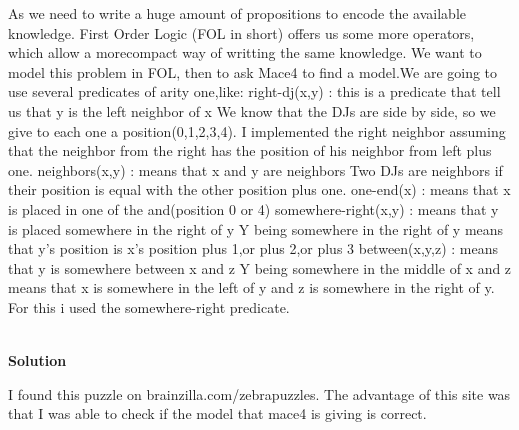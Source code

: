 ﻿\documentclass[a4paper,12pt]{report}
\begin{document}
As we need to write a huge amount of propositions to encode the available knowledge.\newline
First Order Logic (FOL in short) offers us some more operators, which allow a more\newline compact way of writting the same knowledge.\newline
We want to model this problem in FOL, then to ask Mace4 to find a model.We are going to \newline use several predicates of arity one,like:\newline \newline
right-dj(x,y) : this is a predicate that tell us that y is the left neighbor of x\newline
We know that the DJs are side by side, so we give to each one a position(0,1,2,3,4). I implemented the right neighbor assuming that the neighbor from the right has the \newline position of his neighbor from left plus one. \newline \newline
neighbors(x,y) : means that x and y are neighbors\newline
Two DJs are neighbors if their position is equal with the other position plus one.\newline \newline
one-end(x) : means that x is placed in one of the and(position 0 or 4)\newline\newline
somewhere-right(x,y) : means that y is placed somewhere in the right of y\newline
Y being somewhere in the right of y means that y's position is x's position plus 1,or plus 2,\newline or plus 3\newline \newline
between(x,y,z) : means that y is somewhere between x and z \newline
Y being somewhere in the middle of x and z means that x is somewhere in the left of y and z is somewhere in the right of y. For this i used the somewhere-right predicate.\newline \newline
\\
\\
\begin{Large}
 \textbf{Solution}\\
\end{Large}
\newline
I found this puzzle on brainzilla.com/zebra­puzzles. The advantage of this site was that \newline I was able to check if the model that mace4 is giving is correct.
\end{document}
